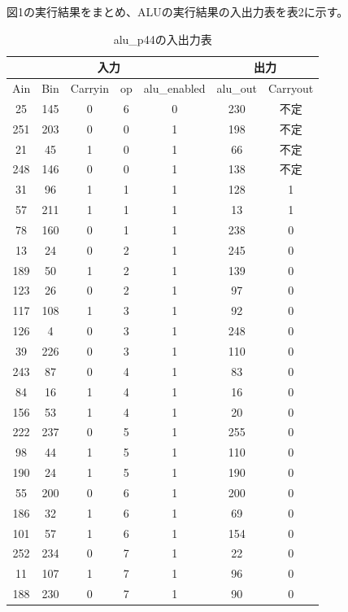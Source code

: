 \documentclass[12pt]{jreport}
\begin{document}
        図1の実行結果をまとめ、ALUの実行結果の入出力表を表2に示す。

        \begin{table}[htb]
          \begin{center}
            \caption{alu\_p44の入出力表}
            \begin{tabular} {|c|c|c|c|c|c|c|} \hline
                \multicolumn{5}{|c|}{入力} & \multicolumn{2}{|c|}{出力} \\ \hline \hline
                Ain & Bin & Carryin & op & alu\_enabled & alu\_out & Carryout \\ \hline
                25 & 145 & 0 & 6 & 0 & 230 & 不定 \\ \hline
                251 & 203 & 0 & 0 & 1 & 198 & 不定 \\ \hline
                21 & 45 & 1 & 0 & 1 & 66 & 不定 \\ \hline
                248 & 146 & 0 & 0 & 1 & 138 & 不定 \\ \hline
                31 & 96 & 1 & 1 & 1 & 128  & 1 \\ \hline
                57 & 211 & 1 & 1 & 1 & 13 & 1 \\ \hline
                78 & 160 & 0 & 1 & 1 & 238 & 0 \\ \hline
                13 & 24 & 0 & 2 & 1 & 245 & 0 \\ \hline
                189 & 50 & 1 & 2 & 1 & 139 & 0 \\ \hline
                123 & 26 & 0 & 2 & 1 & 97 & 0 \\ \hline
                117 & 108 & 1 & 3 & 1 & 92 & 0 \\ \hline
                126 & 4 &  0 & 3 & 1 & 248 & 0 \\ \hline
                39 & 226 & 0 & 3 & 1 & 110 & 0 \\ \hline
                243 & 87 & 0 & 4 & 1 & 83 & 0 \\ \hline
                84 & 16 & 1 & 4 & 1 & 16 & 0 \\ \hline
                156 & 53 & 1 & 4 & 1 & 20 & 0 \\ \hline
                222 & 237 & 0 & 5 & 1 & 255 & 0 \\ \hline
                98 & 44 & 1 & 5 & 1 & 110 & 0 \\ \hline
                190 & 24 & 1 & 5 & 1 & 190 & 0 \\ \hline
                55 & 200 & 0 & 6 & 1 & 200 & 0 \\ \hline
                186 & 32 & 1 & 6 & 1 & 69 & 0 \\ \hline
                101 & 57 & 1 & 6 & 1 & 154 & 0 \\ \hline
                252 & 234 & 0 & 7 & 1 & 22 & 0 \\ \hline
                11 & 107 & 1 & 7 & 1 & 96 & 0 \\ \hline
                188 & 230 & 0 & 7 & 1 & 90 & 0 \\ \hline
            \end{tabular}
          \end{center}
        \end{table}
\end{document}
